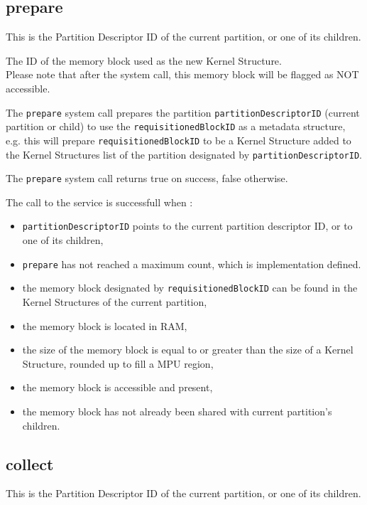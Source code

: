 \documentclass[10pt,a4paper,titlepage]{refart}
\begin{document}
\subsection{prepare}
This is the Partition Descriptor ID of the current partition, or one of its children.

The ID of the memory block used as the new Kernel Structure.\\
Please note that after the system call, this memory block will be flagged as NOT accessible.

\medskip
The \texttt{prepare} system call prepares the partition \texttt{partitionDescriptorID} (current partition
or child) to use the \texttt{requisitionedBlockID} as a metadata structure,
e.g. this will prepare \texttt{requisitionedBlockID} to be a Kernel Structure added to the Kernel Structures
list of the partition designated by \texttt{partitionDescriptorID}.

The \texttt{prepare} system call returns true on success, false otherwise.

The call to the service is successfull when :
\begin{itemize}
    \item \texttt{partitionDescriptorID} points to the current partition descriptor ID, or to one of its children,
    \item \texttt{prepare} has not reached a maximum count, which is implementation defined.
    \item the memory block designated by \texttt{requisitionedBlockID} can be found in the Kernel Structures of the current partition,
    \item the memory block is located in RAM,
    \item the size of the memory block is equal to or greater than the size of a Kernel Structure, rounded up to fill a MPU region,
    \item the memory block is accessible and present,
    \item the memory block has not already been shared with current partition's children.
\end{itemize}

\subsection{collect}
This is the Partition Descriptor ID of the current partition, or one of its children.
\end{document}
